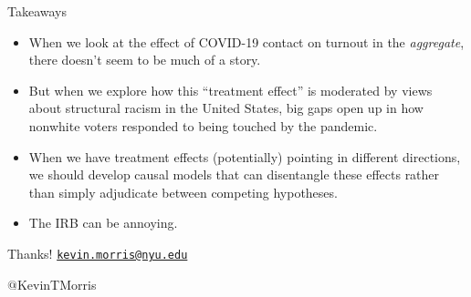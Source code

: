 \documentclass[
  ignorenonframetext,
  aspectratio=169]{beamer}
\providecommand{\tightlist}{%
  \setlength{\itemsep}{0pt}\setlength{\parskip}{0pt}}
\begin{document}
\begin{frame}{Takeaways}
\protect\hypertarget{takeaways}{}
\begin{itemize}[<+->]
\tightlist
\item
  When we look at the effect of COVID-19 contact on turnout in the
  \emph{aggregate}, there doesn't seem to be much of a story.
\end{itemize}

\begin{itemize}[<+->]
\tightlist
\item
  But when we explore how this ``treatment effect'' is moderated by
  views about structural racism in the United States, big gaps open up
  in how nonwhite voters responded to being touched by the pandemic.
\end{itemize}

\begin{itemize}[<+->]
\tightlist
\item
  When we have treatment effects (potentially) pointing in different
  directions, we should develop causal models that can disentangle these
  effects rather than simply adjudicate between competing hypotheses.
\end{itemize}

\begin{itemize}[<+->]
\tightlist
\item
  The IRB can be annoying.
\end{itemize}
\end{frame}

\begin{frame}{Thanks!}
\protect\hypertarget{thanks}{}
\href{mailto:kevin.morris@nyu.edu}{\nolinkurl{kevin.morris@nyu.edu}}

\(@\)KevinTMorris
\end{frame}
\end{document}
